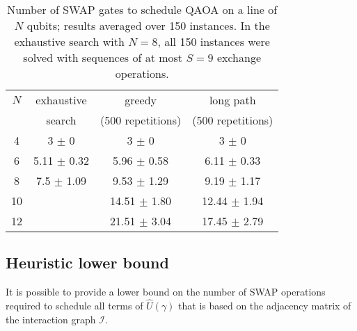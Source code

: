 \documentclass[%
onecolumn,pra,
superscriptaddress,
nofootinbib,
 amsmath,amssymb,
 aps,
11pt,
]{revtex4-1}
\begin{document}
\begin{table}[ht]
\centering
\begin{tabular}{ | c || c | c | c |}
\hline
    \hspace{4mm}$N$\hspace{4mm} & \hspace{3mm}exhaustive\hspace{3mm} &      greedy       &     long path \\
                                &   search   & (500 repetitions) & (500 repetitions) \\
\hline \hline
     4 & 3    $\pm$ 0    &  3    $\pm$ 0    &  3    $\pm$ 0    \\ \hline
     6 & 5.11 $\pm$ 0.32 &  5.96 $\pm$ 0.58 &  6.11 $\pm$ 0.33 \\ \hline
     8 & 7.5  $\pm$ 1.09 &  9.53 $\pm$ 1.29 &  9.19 $\pm$ 1.17 \\ \hline
    10 &                 & 14.51 $\pm$ 1.80 & 12.44 $\pm$ 1.94 \\ \hline
    12 &                 & 21.51 $\pm$ 3.04 & 17.45 $\pm$ 2.79 \\ \hline
\end{tabular}
\vspace{0.3cm}
\caption{Number of SWAP gates to schedule QAOA on a line of $N$ qubits; results averaged over 150 instances. In the exhaustive search with $N=8$, all 150 instances were solved with sequences of at most $S=9$ exchange operations.}
\label{table:exhaustive_search}
\end{table}

\subsection{Heuristic lower bound}
\label{app:heuristic_lower_bound}

It is possible to provide a lower bound on the number of SWAP operations required to schedule all terms of $\hat{U}(\gamma)$ that is based on the adjacency matrix of the interaction graph $\mathcal{I}$.
\end{document}
